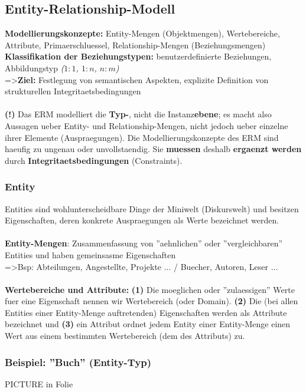\documentclass[a4paper,10pt]{article}
\begin{document}
\subsection{Entity-Relationship-Modell}
\textbf{Modellierungskonzepte:} Entity-Mengen (Objektmengen), Wertebereiche, Attribute, Primaerschluessel, Relationship-Mengen (Beziehungsmengen)\\
\textbf{Klassifikation der Beziehungstypen:} benutzerdefinierte Beziehungen, Abbildungstyp \emph{($1:1$, $1:n$, $n:m$)}\\
=\textgreater \textbf{Ziel:} Festlegung von semantischen Aspekten, explizite Definition von strukturellen Integritaetsbedingungen
\\~\\
\textbf{(!)} Das ERM modelliert die \textbf{Typ-}, nicht die Instanz\textbf{ebene}; es macht also Aussagen ueber Entity- und Relationship-Mengen, nicht jedoch ueber einzelne ihrer Elemente (Auspraegungen). Die Modellierungskonzepte des ERM sind haeufig zu ungenau oder unvollstaendig. Sie \textbf{muessen} deshalb \textbf{ergaenzt werden} durch \textbf{Integritaetsbedingungen} (Constraints).

\subsubsection{Entity}
Entities sind wohlunterscheidbare Dinge der Miniwelt (Diskurswelt) und besitzen Eigenschaften, deren konkrete Auspraegungen als Werte bezeichnet werden.
\\~\\
\textbf{Entity-Mengen}: Zusammenfassung von ''aehnlichen'' oder ''vergleichbaren'' Entities und haben gemeinsasme Eigenschaften\\
=\textgreater Bsp: Abteilungen, Angestellte, Projekte ... / Buecher, Autoren, Leser ...
\\~\\
\textbf{Wertebereiche und Attribute:} \textbf{(1)} Die moeglichen oder ''zulaessigen'' Werte fuer eine Eigenschaft nennen wir Wertebereich (oder Domain). \textbf{(2)} Die (bei allen Entities einer Entity-Menge auftretenden) Eigenschaften werden als Attribute bezeichnet und \textbf{(3)} ein Attribut ordnet jedem Entity einer Entity-Menge einen Wert aus einem bestimmten Wertebereich (dem des Attributs) zu.

\subsubsection{Beispiel: ''Buch'' (Entity-Typ)}
PICTURE in Folie
\end{document}

